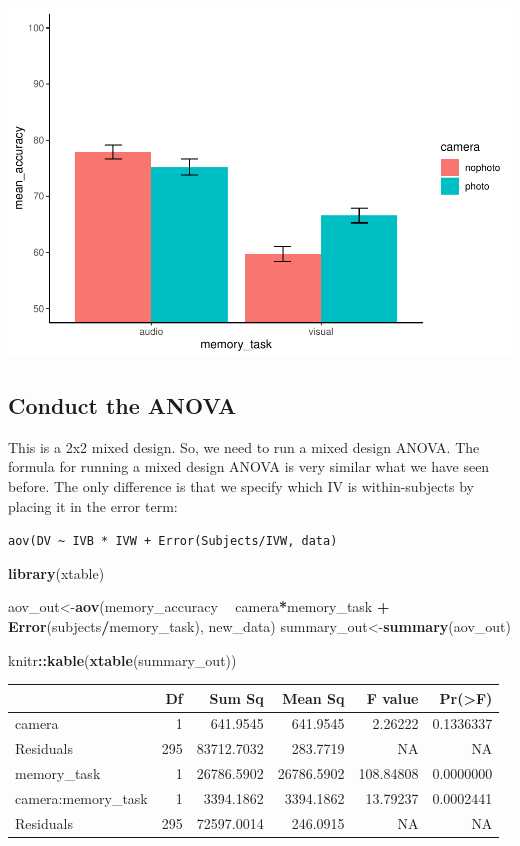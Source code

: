 \documentclass[]{book}
\newenvironment{Shaded}{\begin{snugshade}}{\end{snugshade}}
\newcommand{\KeywordTok}[1]{\textcolor[rgb]{0.13,0.29,0.53}{\textbf{#1}}}
\newcommand{\StringTok}[1]{\textcolor[rgb]{0.31,0.60,0.02}{#1}}
\newcommand{\OperatorTok}[1]{\textcolor[rgb]{0.81,0.36,0.00}{\textbf{#1}}}
\newcommand{\NormalTok}[1]{#1}
\begin{document}
\includegraphics{Statistics_Lab_files/figure-latex/unnamed-chunk-330-1.pdf}

\subsection{Conduct the ANOVA}\label{conduct-the-anova-2}

This is a 2x2 mixed design. So, we need to run a mixed design ANOVA. The
formula for running a mixed design ANOVA is very similar what we have
seen before. The only difference is that we specify which IV is
within-subjects by placing it in the error term:

\texttt{aov(DV\ \textasciitilde{}\ IVB\ *\ IVW\ +\ Error(Subjects/IVW,\ data)}

\begin{Shaded}
\begin{Highlighting}[]
\KeywordTok{library}\NormalTok{(xtable)}

\NormalTok{aov_out<-}\KeywordTok{aov}\NormalTok{(memory_accuracy }\OperatorTok{~}\StringTok{ }\NormalTok{camera}\OperatorTok{*}\NormalTok{memory_task }\OperatorTok{+}\StringTok{ }\KeywordTok{Error}\NormalTok{(subjects}\OperatorTok{/}\NormalTok{memory_task), new_data)}
\NormalTok{summary_out<-}\KeywordTok{summary}\NormalTok{(aov_out)}

\NormalTok{knitr}\OperatorTok{::}\KeywordTok{kable}\NormalTok{(}\KeywordTok{xtable}\NormalTok{(summary_out))}
\end{Highlighting}
\end{Shaded}

\begin{tabular}{l|r|r|r|r|r}
\hline
  & Df & Sum Sq & Mean Sq & F value & Pr(>F)\\
\hline
camera & 1 & 641.9545 & 641.9545 & 2.26222 & 0.1336337\\
\hline
Residuals & 295 & 83712.7032 & 283.7719 & NA & NA\\
\hline
memory\_task & 1 & 26786.5902 & 26786.5902 & 108.84808 & 0.0000000\\
\hline
camera:memory\_task & 1 & 3394.1862 & 3394.1862 & 13.79237 & 0.0002441\\
\hline
Residuals & 295 & 72597.0014 & 246.0915 & NA & NA\\
\hline
\end{tabular}
\end{document}
